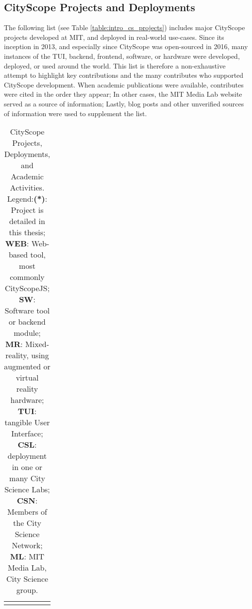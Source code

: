\begin{rotatepage}
    \begin{landscape}

        \subsection{CityScope Projects and Deployments}
        {
            The following list (see Table \eqref{table:intro_cs_projects}) includes major CityScope projects developed at MIT, and deployed in real-world use-cases. Since its inception in 2013, and especially since CityScope was open-sourced in 2016, many instances of the TUI, backend, frontend, software, or hardware were developed, deployed, or used around the world. This list is therefore a non-exhaustive attempt to highlight key contributions and the many contributes who supported CityScope development. When academic publications were available, contributes were cited in the order they appear; In other cases, the MIT Media Lab website served as a source of information; Lastly, blog posts and other unverified sources of information were used to supplement the list.
        }


        \scriptsize
        \begin{longtable}
            {>{\raggedright}p{}>{\raggedright}p{}p{}p{}p{}p{}}

            \\
            \caption[CityScope Projects]
            {
                \bigskip
                CityScope Projects, Deployments, and Academic Activities.
                \newline
                \scriptsize Legend:\textbf{(*)}: Project is detailed in this thesis; \textbf{WEB}: Web-based tool, most commonly CityScopeJS; \textbf{SW}: Software tool or backend module; \textbf{MR}: Mixed-reality, using augmented or virtual reality hardware; \textbf{TUI}: tangible User Interface; \textbf{CSL}: deployment in one or many City Science Labs; \textbf{CSN}: Members of the City Science Network; \textbf{ML}: MIT Media Lab, City Science group.
                \bigskip
            }
            \label{table:intro_cs_projects}                                                                                                                                                                                                                                                                                                                                                                                                                   \\


\end{longtable}
\end{landscape}
\end{rotatepage}
